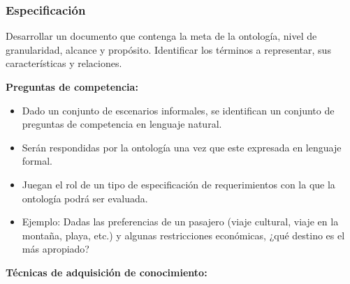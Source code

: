 \documentclass[a4paper,10pt,spanish,oneside]{article}
\begin{document}
\subsubsection{Especificación}

Desarrollar un documento que contenga la meta de la ontología, nivel de granularidad, alcance y propósito. Identificar los términos a representar, sus características y relaciones.

\textbf{Preguntas de competencia:}

\begin{itemize}
\item Dado un conjunto de escenarios informales, se identifican un conjunto de preguntas de competencia en lenguaje natural.
\item Serán respondidas por la ontología una vez que este expresada en lenguaje formal.
\item Juegan el rol de un tipo de especificación de requerimientos con la que la ontología podrá ser evaluada.
\item Ejemplo: Dadas las preferencias de un pasajero (viaje cultural, viaje en la montaña, playa, etc.) y algunas restricciones económicas, ¿qué destino es el más apropiado?
\end{itemize}

\textbf{Técnicas de adquisición de conocimiento:}
\end{document}
